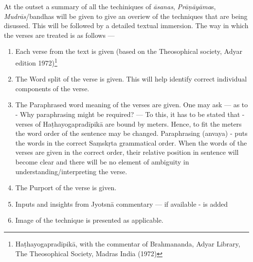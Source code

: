 At the outset a summary of all the techiniques of \textit{āsanas}, \textit{Prāṇāyāma}s, \textit{Mudrās}/bandhas will be given to give an overiew of the techniques that are being disussed. This will be followed by a detailed textual immersion. The way in which the verses are treated is as follows ---
\begin{enumerate}
\itemsep=0pt
\item Each verse from the text is given (based on the Theosophical society, Adyar edition 1972)\footnote{Haṭhayogapradīpikā, with the commentar of Brahmananda, Adyar Library, The Theosophical Society, Madras India (1972)}
\item The Word split of the verse is given. This will help identify correct individual components of the verse.   
\item The Paraphrased word meaning of the verses are given. One may ask --- as to - Why paraphrasing might be required? --- To this, it has to be stated that - verses of Haṭhayogapradīpikā are bound by meters. Hence, to fit the meters the word order of the sentence may be changed. Paraphrasing (anvaya) -  puts the words in the correct Saṃskṛta grammatical order. When the words of the verses are given in the correct order, their relative position in sentence will become clear and there will be no element of ambiguity in understanding/interpreting the verse.    
\item The Purport of the verse is given. 
\item Inputs and insights from Jyotsnā commentary --- if available - is added 
\item Image of the technique is presented as applicable.
\end{enumerate}
